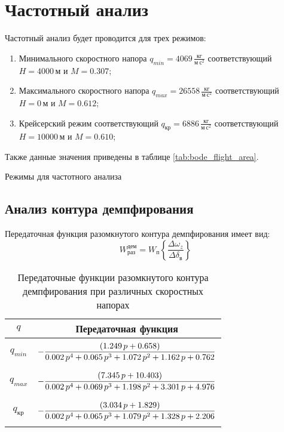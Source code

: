 \section{Частотный анализ}

Частотный анализ будет проводится для трех режимов:
\begin{enumerate}
    \item Минимального скоростного напора $q_{min}=4069\, \frac{кг}{м\ с^2}$
        соответствующий $H=4000\, м$ и $M = 0.307$;
    \item Максимального скоростного напора $q_{max}= 26558\, \frac{кг}{м\
        с^2}$ соответствующий $H = 0\, м$ и $M = 0.612$;
    \item Крейсерский режим соответствующий $q_{кр} = 6886\, \frac{кг}{м\
        с^2}$ соответствующий $H = 10000\, м$ и $M = 0.610$;
\end{enumerate}
Также данные значения приведены в таблице \ref{tab:bode_flight_area}.

\begin{table}[H]
    \centering
    \caption{Режимы для частотного анализа}
    \label{tab:bode_flight_area}
    
\end{table}

\subsection{Анализ контура демпфирования}
Передаточная функция разомкнутого контура демпфирования имеет вид:
\begin{equation}
    W_{раз}^{дем} = W_{п} \left\{\frac{\Delta \omega_z}{\Delta \delta_\text{в}} \right\}
\end{equation}

\begin{table}[H]
    \centering
    \caption{Передаточные функции разомкнутого контура демпфирования при различных скоростных напорах}
    \label{tab:demp_ol}
    \begin{tabular}{|c|c|}
    \hline 
    $q$ & Передаточная функция\\ 
    \hline
    $q_{min}$& $\displaystyle -\frac{\left(1.249\,p+0.658\right)}{0.002\,p^4+0.065\,p^3+1.072\,p^2+1.162\,p+0.762}\addstrut{3em}$\\ 
    \hline
    $q_{max}$& $\displaystyle -\frac{\left(7.345\,p+10.403\right)}{0.002\,p^4+0.069\,p^3+1.198\,p^2+3.301\,p+4.976}\addstrut{3em}$\\
    \hline
    $q_{кр}$ & $\displaystyle -\frac{\left(3.034\,p+1.829\right)}{0.002\,p^4+0.065\,p^3+1.079\,p^2+1.328\,p+2.206}\addstrut{3em}$ \\
    \hline
    \end{tabular}
\end{table}

